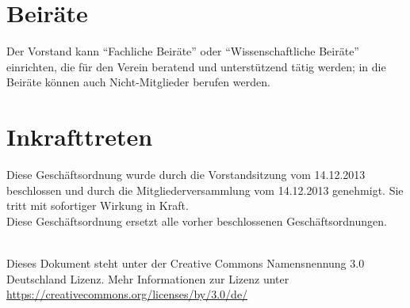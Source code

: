 \documentclass[a4paper, 12pt]{scrartcl}
\begin{document}
\section{Beiräte}
Der Vorstand kann "`Fachliche Beiräte"' oder "`Wissenschaftliche Beiräte"' einrichten,
die für den Verein beratend und unterstützend tätig werden; in die Beiräte können
auch Nicht-Mitglieder berufen werden.

\section{Inkrafttreten}
Diese Geschäftsordnung wurde durch die Vorstandsitzung vom 14.12.2013
beschlossen und durch die Mitgliederversammlung
vom 14.12.2013 genehmigt. Sie tritt mit sofortiger Wirkung in Kraft.\\
Diese Geschäftsordnung ersetzt alle vorher beschlossenen Geschäftsordnungen.

\vfill

\begin{flushright}
	\ccby \\
	{\small
		Dieses Dokument steht unter der Creative Commons Namensnennung 3.0 Deutschland Lizenz. Mehr Informationen zur Lizenz unter \url{https://creativecommons.org/licenses/by/3.0/de/}
	}
\end{flushright}
\end{document}
